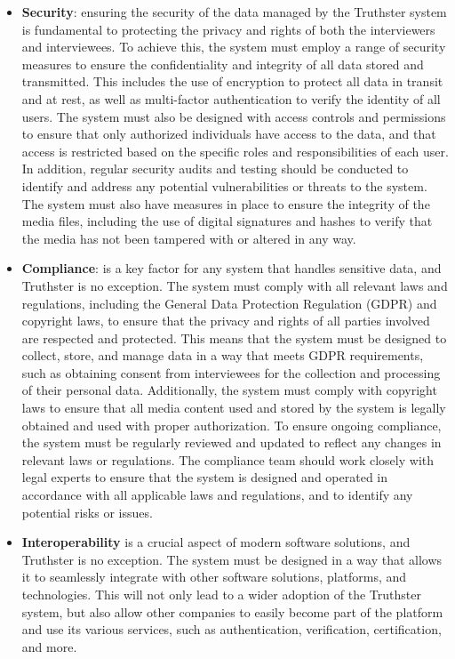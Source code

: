 \documentclass[target=mst,aauheader=]{thud}
\begin{document}
\begin{itemize}
    \item \textbf{Security}: ensuring the security of the data managed by the Truthster system is fundamental to protecting the privacy and rights of both the interviewers and interviewees. To achieve this, the system must employ a range of security measures to ensure the confidentiality and integrity of all data stored and transmitted. This includes the use of encryption to protect all data in transit and at rest, as well as multi-factor authentication to verify the identity of all users. The system must also be designed with access controls and permissions to ensure that only authorized individuals have access to the data, and that access is restricted based on the specific roles and responsibilities of each user. In addition, regular security audits and testing should be conducted to identify and address any potential vulnerabilities or threats to the system. The system must also have measures in place to ensure the integrity of the media files, including the use of digital signatures and hashes to verify that the media has not been tampered with or altered in any way.
    \item \textbf{Compliance}: is a key factor for any system that handles sensitive data, and Truthster is no exception. The system must comply with all relevant laws and regulations, including the General Data Protection Regulation (GDPR) and copyright laws, to ensure that the privacy and rights of all parties involved are respected and protected. This means that the system must be designed to collect, store, and manage data in a way that meets GDPR requirements, such as obtaining consent from interviewees for the collection and processing of their personal data. Additionally, the system must comply with copyright laws to ensure that all media content used and stored by the system is legally obtained and used with proper authorization. To ensure ongoing compliance, the system must be regularly reviewed and updated to reflect any changes in relevant laws or regulations. The compliance team should work closely with legal experts to ensure that the system is designed and operated in accordance with all applicable laws and regulations, and to identify any potential risks or issues.
    \item \textbf{Interoperability} is a crucial aspect of modern software solutions, and Truthster is no exception. The system must be designed in a way that allows it to seamlessly integrate with other software solutions, platforms, and technologies. This will not only lead to a wider adoption of the Truthster system, but also allow other companies to easily become part of the platform and use its various services, such as authentication, verification, certification, and more.

\end{itemize}
\end{document}
